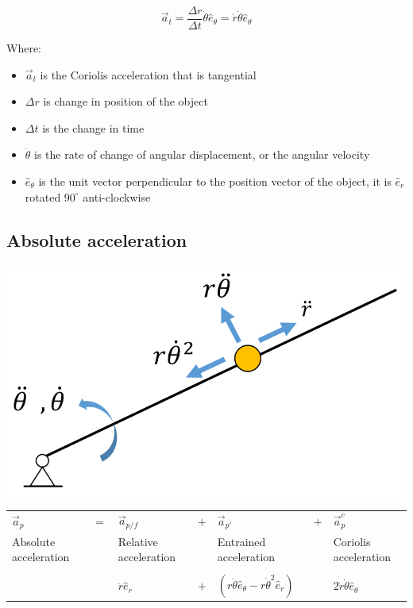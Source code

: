 \documentclass[11pt]{article}
\begin{document}
\[\vec{a}_t = \frac{\Delta r}{\Delta t} \dot{\theta} \hat{e}_{\theta} = \dot{r} \dot{\theta} \hat{e}_{\theta}\]

Where:
\begin{itemize}
\item \(\vec{a}_t\) is the Coriolis acceleration that is tangential
\item \(\Delta r\) is change in position of the object
\item \(\Delta t\) is the change in time
\item \(\dot{\theta}\) is the rate of change of angular displacement, or the angular velocity
\item \(\hat{e}_{\theta}\) is the unit vector perpendicular to the position vector of the object, it is \(\hat{e}_r\) rotated \(90^{\circ}\) anti-clockwise
\end{itemize}
\subsection{Absolute acceleration}
\label{sec:orgf8c3306}
\begin{center}
\includegraphics[width=.9\linewidth]{./images/absolute-acceleration-diagram.png}
\end{center}

\begin{center}
\begin{tabular}{>{\centering\arraybackslash}m{6em} >{\centering\arraybackslash}m{2em} >{\centering\arraybackslash}m{6em} >{\centering\arraybackslash}m{2em} >{\centering\arraybackslash}m{6em} >{\centering\arraybackslash}m{2em} >{\centering\arraybackslash}m{6em}}
\(\vec{a}_p\) & \(=\) & \(\vec{a}_{p/f}\) & \(+\) & \(\vec{a}_{p'}\) & \(+\) & \(\vec{a}_p^c\)\\
Absolute acceleration &  & Relative acceleration &  & Entrained acceleration &  & Coriolis acceleration\\
 &  &  &  &  &  & \\
 &  & \(\ddot{r} \hat{e}_r\) & \(+\) & \((r \ddot{\theta} \hat{e}_{\theta} - r \dot{\theta}^2 \hat{e}_r)\) &  & \(2 \dot{r} \dot{\theta} \hat{e}_{\theta}\)\\
\end{tabular}
\end{center}
\end{document}
